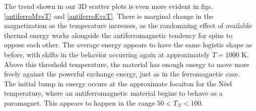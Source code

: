 \documentclass[12pt]{article}
\begin{document}
The trend shown in our 3D scatter plots is even more evident in figs. \ref{antiferroMvsT} and \ref{antiferroEvsT}.  There is marginal change in the magnetization as the temperature increases, as the randomizing effect of available thermal energy works alongside the antiferromagnetic tendency for spins to oppose each other.  The average energy appears to have the same logistic shape as before, with shifts in the behavior occurring again at approximately $T = 1000$ K.  Above this threshold temperature, the material has enough energy to move more freely against the powerful exchange energy, just as in the ferromagnetic case.  The initial bump in energy occurs at the approximate locaiton for the N\'{e}el temperature, where an antiferromagnetic material begins to behave as a paramagnet. \cite{magnettypes, fromjesse}  This appears to happen in the range $50 < T_N < 100$.
\end{document}
